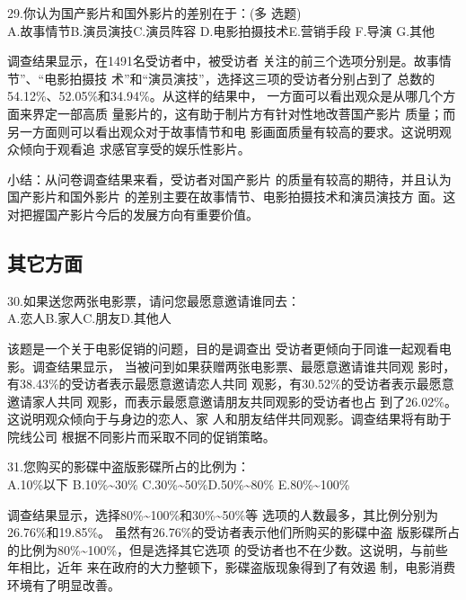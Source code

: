 \documentclass[12pt,twoside]{article}
\newcommand{\heiti}{\CJKfamily{heiti}\enhei}
\begin{document}
\par\noindent 29.你认为国产影片和国外影片的差别在于：(多
选题)\\
A.故事情节\tabskips  B.演员演技\tabskips C.演员阵容\tabskips
D.电影拍摄技术\tabskips E.营销手段 \tabskips F.导演\tabskips
G.其他

\par 调查结果显示，在1491名受访者中，被受访者
关注的前三个选项分别是。故事情节”、“电影拍摄技
术”和“演员演技”，选择这三项的受访者分别占到了
总数的54.12\%、52.05\%和34.94\%。从这样的结果中，
一方面可以看出观众是从哪几个方面来界定一部高质
量影片的，这有助于制片方有针对性地改菩国产影片
质量；而另一方面则可以看出观众对于故事情节和电
影画面质量有较高的要求。这说明观众倾向于观看追
求感官享受的娱乐性影片。
\par {\heiti
小结：从问卷调查结果来看，受访者对国产影片
的质量有较高的期待，并且认为国产影片和国外影片
的差别主要在故事情节、电影拍摄技术和演员演技方
面。这对把握国产影片今后的发展方向有重要价值。
}

\subsection{其它方面}
\par\noindent 30.如果送您两张电影票，请问您最愿意邀请谁同去：\\
A.恋人\tabskips B.家人\tabskips C.朋友\tabskips D.其他人
\par 该题是一个关于电影促销的问题，目的是调查出
受访者更倾向于同谁一起观看电影。调查结果显示，
当被问到如果获赠两张电影票、最愿意邀请谁共同观
影时，有38.43\%的受访者表示最愿意邀请恋人共同
观影，有30.52\%的受访者表示最愿意邀请家人共同
观影，而表示最愿意邀请朋友共同观影的受访者也占
到了26.02\%。这说明观众倾向于与身边的恋人、家
人和朋友结伴共同观影。调查结果将有助于院线公司
根据不同影片而采取不同的促销策略。
\par\noindent 31.您购买的影碟中盗版影碟所占的比例为：\\
A.10\%以下\tabskips
B.10\%\textasciitilde30\%\tabskips
C.30\%\textasciitilde50\%\tabskips  D.50\%\textasciitilde80\%\tabskips
E.80\%\textasciitilde100\%

\par 调查结果显示，选择80\%\textasciitilde100\%和30\%\textasciitilde50\%等
选项的人数最多，其比例分别为26.76\%和19.85\%。
虽然有26.76\%的受访者表示他们所购买的影碟中盗
版影碟所占的比例为80\%\textasciitilde100\%，但是选择其它选项
的受访者也不在少数。这说明，与前些年相比，近年
来在政府的大力整顿下，影碟盗版现象得到了有效遏
制，电影消费环境有了明显改善。
\end{document}
